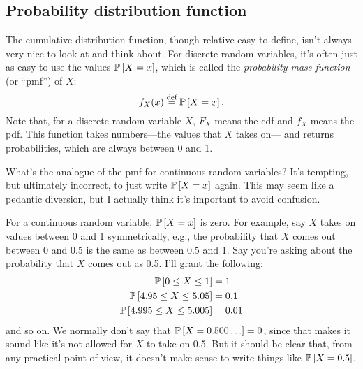 \subsection{Probability distribution function}

The cumulative distribution function, though relative easy to define, isn't
always very nice to look at and think about. For discrete random variables, it's
often just as easy to use the values $\mathbb{P}\left[{X = x}\right]$, which is called the \emph{probability mass function} (or ``pmf'') of $X$:
\begin{equation}
f_X(x) \stackrel{\text{def}}{=} \mathbb{P}\left[{X = x}\right].
\end{equation}
Note that, for a discrete random variable $X$, $F_X$ means the cdf and $f_X$
means the pdf. This function takes numbers---the values that $X$ takes on---
and returns probabilities, which are always between 0 and 1.

What's the analogue of the pmf for continuous random variables? It's tempting,
but ultimately incorrect, to just write $\mathbb{P}\left[{X = x}\right]$ again. This may seem
like a pedantic diversion, but I actually think it's important to avoid
confusion.

For a continuous random variable, $\mathbb{P}\left[{X = x}\right]$ is zero. For example, say $X$
takes on values between 0 and 1 symmetrically, e.g., the probability that $X$
comes out between 0 and 0.5 is the same as between 0.5 and 1. Say you're
asking about the probability that $X$ comes out as 0.5. I'll grant the
following:
\begin{align*}
\mathbb{P}\left[{0 \leq X \leq 1}\right] &= 1 \\
\mathbb{P}\left[{4.95 \leq X \leq 5.05}\right] &= 0.1 \\
\mathbb{P}\left[{4.995 \leq X \leq 5.005}\right] &= 0.01 \\
\end{align*}
and so on. We normally don't say that $\mathbb{P}\left[{X = 0.500\ldots}\right] = 0$, since that
makes it sound like it's not allowed for $X$ to take on 0.5. But it should be
clear that, from any practical point of view, it doesn't make sense to write
things like $\mathbb{P}\left[{X = 0.5}\right]$.

